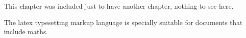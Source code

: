 This chapter was included just to have another chapter, nothing to see here.

The \Gls{latex} typesetting markup language is specially suitable 
for documents that include \gls{maths}.